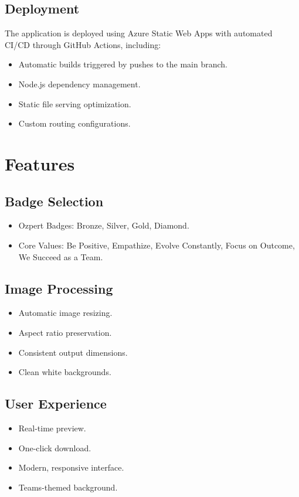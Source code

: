 \documentclass[12pt]{article}
\begin{document}
\subsection{Deployment}
The application is deployed using Azure Static Web Apps with automated CI/CD through GitHub Actions, including:
\begin{itemize}
    \item Automatic builds triggered by pushes to the main branch.
    \item Node.js dependency management.
    \item Static file serving optimization.
    \item Custom routing configurations.
\end{itemize}

\section{Features}
\subsection{Badge Selection}
\begin{itemize}
    \item Ozpert Badges: Bronze, Silver, Gold, Diamond.
    \item Core Values: Be Positive, Empathize, Evolve Constantly, Focus on Outcome, We Succeed as a Team.
\end{itemize}

\subsection{Image Processing}
\begin{itemize}
    \item Automatic image resizing.
    \item Aspect ratio preservation.
    \item Consistent output dimensions.
    \item Clean white backgrounds.
\end{itemize}

\subsection{User Experience}
\begin{itemize}
    \item Real-time preview.
    \item One-click download.
    \item Modern, responsive interface.
    \item Teams-themed background.
\end{itemize}
\end{document}

